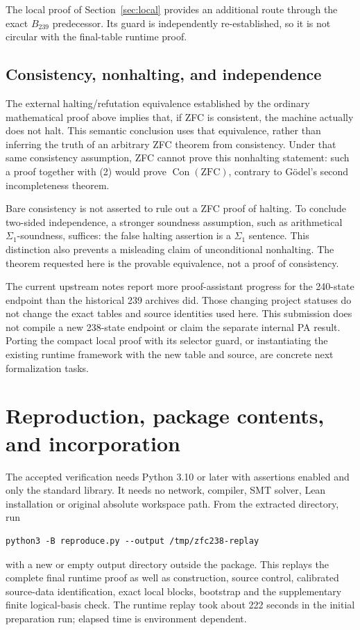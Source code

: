 \documentclass[11pt]{article}
\theoremstyle{definition}\newtheorem{definition}[theorem]{Definition}
\newcommand{\Con}{\operatorname{Con}}
\newcommand{\ZFC}{\mathrm{ZFC}}
\begin{document}
The local proof of Section~\ref{sec:local} provides an additional route
through the exact $B_{239}$ predecessor.  Its guard is independently
re-established, so it is not circular with the final-table runtime proof.

\subsection{Consistency, nonhalting, and independence}

The external halting/refutation equivalence established by the ordinary
mathematical proof above implies that, if ZFC is consistent, the machine
actually does not halt.  This semantic conclusion uses that equivalence,
rather than inferring the truth of an arbitrary ZFC theorem from consistency.
Under that same consistency assumption, ZFC cannot prove this nonhalting
statement: such a proof together with (2) would prove $\Con(\ZFC)$,
contrary to G\"odel's second incompleteness theorem.

Bare consistency is not asserted to rule out a ZFC proof of halting.
To conclude two-sided independence, a stronger soundness assumption, such
as arithmetical $\Sigma_1$-soundness, suffices: the false halting assertion
is a $\Sigma_1$ sentence.  This distinction also prevents a misleading
claim of unconditional nonhalting.  The theorem requested here is the
provable equivalence, not a proof of consistency.

The current upstream notes report more proof-assistant progress for the
240-state endpoint than the historical 239 archives did.  Those changing
project statuses do not change the exact tables and source identities
used here.  This submission does not compile a new 238-state endpoint or
claim the separate internal PA result.  Porting the compact local proof
with its selector guard, or instantiating the existing runtime framework
with the new table and source, are concrete next formalization tasks.



\section{Reproduction, package contents, and incorporation}
\label{sec:reproduce}

The accepted verification needs Python 3.10 or later with assertions
enabled and only the standard library.  It needs no network, compiler,
SMT solver, Lean installation or original absolute workspace path.
From the extracted directory, run
\begin{verbatim}
python3 -B reproduce.py --output /tmp/zfc238-replay
\end{verbatim}
with a new or empty output directory outside the package.  This replays
the complete final runtime proof as well as construction, source control,
calibrated source-data identification, exact local blocks, bootstrap and
the supplementary finite logical-basis check.
The runtime replay took about 222 seconds in the initial preparation run;
elapsed time is environment dependent.
\end{document}
